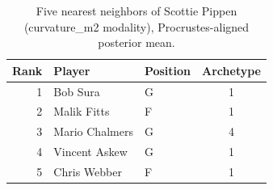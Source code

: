 \begin{table}[htbp]
  \centering\small
  \begin{tabular}{rllc}
    \toprule
    Rank & Player & Position & Archetype \\
    \midrule
    1 & Bob Sura & G & 1 \\
    2 & Malik Fitts & F & 1 \\
    3 & Mario Chalmers & G & 4 \\
    4 & Vincent Askew & G & 1 \\
    5 & Chris Webber & F & 1 \\
    \bottomrule
  \end{tabular}
  \caption{Five nearest neighbors of Scottie Pippen (curvature_m2 modality), Procrustes-aligned posterior mean.}
  \label{tab:Scottie_Pippen_neighbors_curvature_m2}
\end{table}

